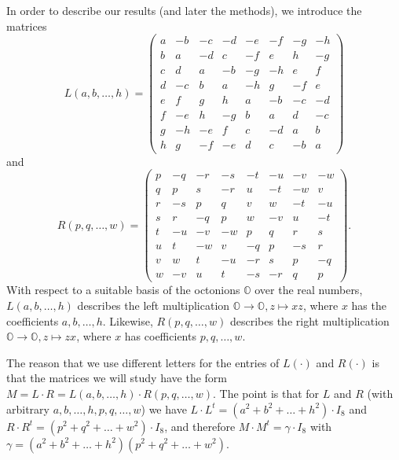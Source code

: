 \documentclass[12pt]{amsart}
\theoremstyle{definition}
\newcommand{\OO}{\mathbb O}
\begin{document}
In order to describe our results (and later the methods), we introduce
the matrices
\[L(a,b,\dots,h)=
\left(\begin{array}{rrrrrrrr}
a & -b & -c & -d & -e & -f & -g & -h \\
b & a & -d & c & -f & e & h & -g \\
c & d & a & -b & -g & -h & e & f \\
d & -c & b & a & -h & g & -f & e \\
e & f & g & h & a & -b & -c & -d \\
f & -e & h & -g & b & a & d & -c \\
g & -h & -e & f & c & -d & a & b \\
h & g & -f & -e & d & c & -b & a
\end{array}\right)
\]
and
\[R(p,q,\dots,w)=
\left(\begin{array}{rrrrrrrr}
p & -q & -r & -s & -t & -u & -v & -w \\
q & p & s & -r & u & -t & -w & v \\
r & -s & p & q & v & w & -t & -u \\
s & r & -q & p & w & -v & u & -t \\
t & -u & -v & -w & p & q & r & s \\
u & t & -w & v & -q & p & -s & r \\
v & w & t & -u & -r & s & p & -q \\
w & -v & u & t & -s & -r & q & p
\end{array}\right).
\]
With respect to a suitable basis of the octonions $\OO$ over the real
numbers, $L(a,b,\dots,h)$ describes the left multiplication
$\OO\to\OO, z\mapsto xz$, where $x$ has the coefficients
$a,b,\dots,h$. Likewise, $R(p,q,\dots,w)$ describes the right
multiplication $\OO\to\OO, z\mapsto zx$, where $x$ has coefficients
$p,q,\dots,w$.

The reason that we use different letters for the entries of $L(\cdot)$
and $R(\cdot)$ is that the matrices we will study have the form
$M=L\cdot R=L(a,b,\dots,h)\cdot R(p,q,\dots,w)$. The point is that for
$L$ and $R$ (with arbitrary $a,b,\dots,h,p,q,\dots,w$) we have
$L\cdot L^t=(a^2+b^2+\dots+h^2)\cdot I_8$ and
$R\cdot R^t=(p^2+q^2+\dots+w^2)\cdot I_8$, and therefore
$M\cdot M^t=\gamma\cdot I_8$ with
$\gamma=(a^2+b^2+\dots+h^2)(p^2+q^2+\dots+w^2)$.
\end{document}

